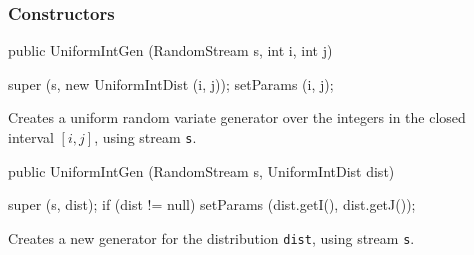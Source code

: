 \subsubsection* {Constructors}
\begin{code}

   public UniformIntGen (RandomStream s, int i, int j) \begin{hide} {
      super (s, new UniformIntDist (i, j));
      setParams (i, j);
   }\end{hide}
\end{code}
  \begin{tabb} Creates a uniform random variate generator over the integers
  in the closed interval $[i, j]$, using stream \texttt{s}. 
 \end{tabb}
\begin{code}

   public UniformIntGen (RandomStream s, UniformIntDist dist) \begin{hide} {
      super (s, dist);
      if (dist != null)
         setParams (dist.getI(), dist.getJ());
   }\end{hide}
\end{code}
  \begin{tabb} Creates a new generator for the distribution \texttt{dist}, using 
    stream \texttt{s}.  
 \end{tabb}



